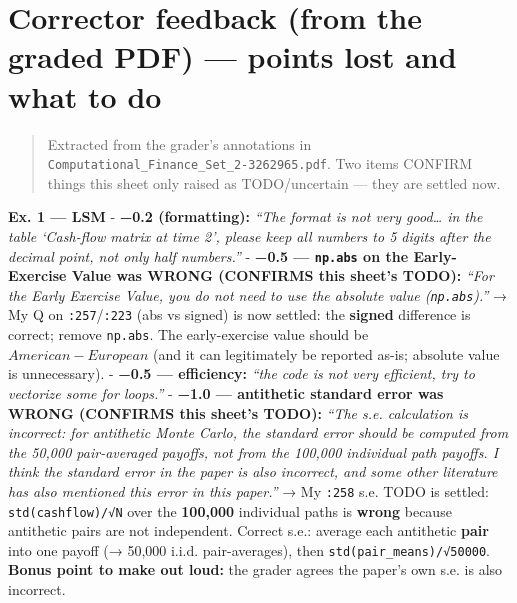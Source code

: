 \documentclass[
  11pt,
]{article}
\begin{document}
\hypertarget{corrector-feedback-from-the-graded-pdf-points-lost-and-what-to-do}{%
\section{Corrector feedback (from the graded PDF) --- points lost and
what to
do}\label{corrector-feedback-from-the-graded-pdf-points-lost-and-what-to-do}}

\begin{quote}
Extracted from the grader's annotations in
\texttt{Computational\_Finance\_Set\_2-3262965.pdf}. Two items CONFIRM
things this sheet only raised as TODO/uncertain --- they are settled
now.
\end{quote}

\textbf{Ex. 1 --- LSM} - \textbf{−0.2 (formatting):} \emph{``The format
is not very good\ldots{} in the table `Cash-flow matrix at time 2',
please keep all numbers to 5 digits after the decimal point, not only
half numbers.''} - \textbf{−0.5 --- \texttt{np.abs} on the
Early-Exercise Value was WRONG (CONFIRMS this sheet's TODO):}
\emph{``For the Early Exercise Value, you do not need to use the
absolute value (\texttt{np.abs}).''} → My Q on
\texttt{:257}/\texttt{:223} (abs vs signed) is now settled: the
\textbf{signed} difference is correct; remove \texttt{np.abs}. The
early-exercise value should be \(American − European\) (and it can
legitimately be reported as-is; absolute value is unnecessary). -
\textbf{−0.5 --- efficiency:} \emph{``the code is not very efficient,
try to vectorize some for loops.''} - \textbf{−1.0 --- antithetic
standard error was WRONG (CONFIRMS this sheet's TODO):} \emph{``The s.e.
calculation is incorrect: for antithetic Monte Carlo, the standard error
should be computed from the 50,000 pair-averaged payoffs, not from the
100,000 individual path payoffs. I think the standard error in the paper
is also incorrect, and some other literature has also mentioned this
error in this paper.''} → My \texttt{:258} s.e. TODO is settled:
\texttt{std(cashflow)/√N} over the \textbf{100,000} individual paths is
\textbf{wrong} because antithetic pairs are not independent. Correct
s.e.: average each antithetic \textbf{pair} into one payoff (→ 50,000
i.i.d. pair-averages), then \texttt{std(pair\_means)/√50000}.
\textbf{Bonus point to make out loud:} the grader agrees the paper's own
s.e. is also incorrect.
\end{document}
